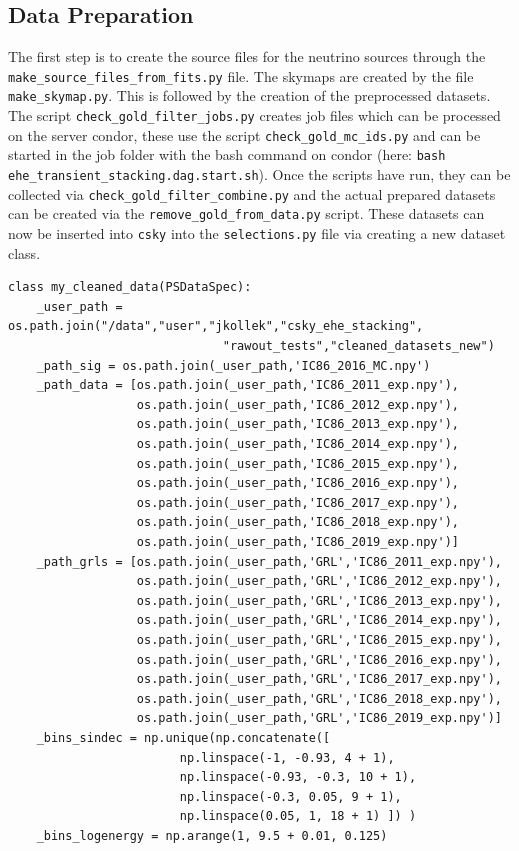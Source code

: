 \subsection{Data Preparation}
The first step is to create the source files for the neutrino sources through the \texttt{make\_source\_files\_from\_fits.py} file.
The skymaps are created by the file \texttt{make\_skymap.py}.
This is followed by the creation of the preprocessed datasets.
The script \texttt{check\_gold\_filter\_jobs.py} creates job files which can be processed on the server condor, these use the script \texttt{check\_gold\_mc\_ids.py} and can be started in the job folder with the bash command on condor (here: \texttt{bash ehe\_transient\_stacking.dag.start.sh}).
Once the scripts have run, they can be collected via \texttt{check\_gold\_filter\_combine.py} and the actual prepared datasets can be created via the \texttt{remove\_gold\_from\_data.py} script.
These datasets can now be inserted into \texttt{csky} into the \texttt{selections.py} file via creating a new dataset class.

\begin{verbatim}
class my_cleaned_data(PSDataSpec):
    _user_path = os.path.join("/data","user","jkollek","csky_ehe_stacking",
                              "rawout_tests","cleaned_datasets_new")
    _path_sig = os.path.join(_user_path,'IC86_2016_MC.npy')
    _path_data = [os.path.join(_user_path,'IC86_2011_exp.npy'),
                  os.path.join(_user_path,'IC86_2012_exp.npy'),
                  os.path.join(_user_path,'IC86_2013_exp.npy'),
                  os.path.join(_user_path,'IC86_2014_exp.npy'),
                  os.path.join(_user_path,'IC86_2015_exp.npy'),
                  os.path.join(_user_path,'IC86_2016_exp.npy'),
                  os.path.join(_user_path,'IC86_2017_exp.npy'),
                  os.path.join(_user_path,'IC86_2018_exp.npy'),
                  os.path.join(_user_path,'IC86_2019_exp.npy')]
    _path_grls = [os.path.join(_user_path,'GRL','IC86_2011_exp.npy'),
                  os.path.join(_user_path,'GRL','IC86_2012_exp.npy'),
                  os.path.join(_user_path,'GRL','IC86_2013_exp.npy'),
                  os.path.join(_user_path,'GRL','IC86_2014_exp.npy'),
                  os.path.join(_user_path,'GRL','IC86_2015_exp.npy'),
                  os.path.join(_user_path,'GRL','IC86_2016_exp.npy'),
                  os.path.join(_user_path,'GRL','IC86_2017_exp.npy'),
                  os.path.join(_user_path,'GRL','IC86_2018_exp.npy'),
                  os.path.join(_user_path,'GRL','IC86_2019_exp.npy')]
    _bins_sindec = np.unique(np.concatenate([
                        np.linspace(-1, -0.93, 4 + 1),
                        np.linspace(-0.93, -0.3, 10 + 1),
                        np.linspace(-0.3, 0.05, 9 + 1),
                        np.linspace(0.05, 1, 18 + 1) ]) )
    _bins_logenergy = np.arange(1, 9.5 + 0.01, 0.125)
\end{verbatim}

